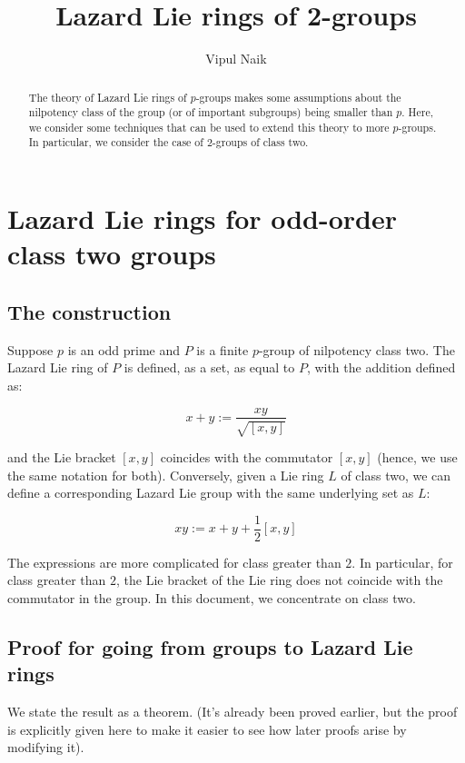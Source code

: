 \documentclass[10pt]{amsart}
\title{Lazard Lie rings of 2-groups}
\author{Vipul Naik}
\begin{document}
\maketitle

\begin{abstract}
  The theory of Lazard Lie rings of $p$-groups makes some assumptions
  about the nilpotency class of the group (or of important subgroups)
  being smaller than $p$. Here, we consider some techniques that can
  be used to extend this theory to more $p$-groups. In particular, we
  consider the case of $2$-groups of class two.
\end{abstract}

\section{Lazard Lie rings for odd-order class two groups}

\subsection{The construction}

Suppose $p$ is an odd prime and $P$ is a finite $p$-group of
nilpotency class two. The Lazard Lie ring of $P$ is defined, as a set,
as equal to $P$, with the addition defined as:

$$x + y := \frac{xy}{\sqrt{[x,y]}}$$

and the Lie bracket $[x,y]$ coincides with the commutator $[x,y]$
(hence, we use the same notation for both). Conversely, given a Lie
ring $L$ of class two, we can define a corresponding Lazard Lie group
with the same underlying set as $L$:

$$xy := x + y + \frac{1}{2}[x,y]$$

The expressions are more complicated for class greater than $2$. In
particular, for class greater than $2$, the Lie bracket of the Lie
ring does not coincide with the commutator in the group. In this
document, we concentrate on class two.

\subsection{Proof for going from groups to Lazard Lie rings}

We state the result as a theorem. (It's already been proved earlier,
but the proof is explicitly given here to make it easier to see how
later proofs arise by modifying it).
\end{document}
